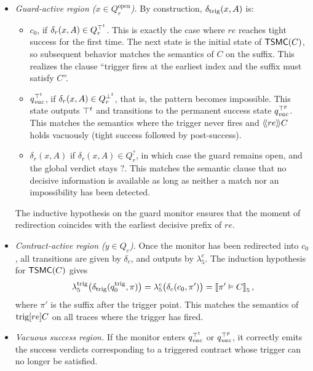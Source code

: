     \begin{itemize}
      \item \emph{Guard-active region ($x\in Q_r^{\text{open}}$).}
      By construction, $\delta_{\trigg}(x,A)$ is:
      \begin{itemize}
        \item $c_0$, if $\delta_r(x,A)\in Q_r^{\topt}$.
        This is exactly the case
        where $re$ reaches tight success for the first time.
        The next state is the
        initial state of $\tsmc(C)$, so subsequent behavior matches the semantics
        of $C$ on the suffix.
        This realizes the clause “trigger fires at the
        earliest index and the suffix must satisfy $C$”.
        
        \item $q_{\mathit{vac}}^{\topt}$, if $\delta_r(x,A)\in Q_r^{\bott}$, that is, the pattern becomes impossible.
        This state outputs $\topt$ and transitions to the permanent success state $q_{\mathit{vac}}^{\topp}$.
        This matches the semantics where the trigger never fires and $\trig[re]{C}$
        holds vacuously (tight success followed by post-success).
    
        \item $\delta_r(x,A)$ if $\delta_r(x,A)\in Q_r^{?}$, in which case the
        guard remains open, and the global verdict stays $\mathsf{?}$.
        This matches the semantic clause that no decisive information is available as long as neither a match nor an impossibility has been detected.
      \end{itemize}
      The inductive hypothesis on the guard monitor ensures that the moment of redirection coincides with the earliest decisive prefix of $re$.
    
      \item \emph{Contract-active region ($y\in Q_c$).}
      Once the monitor has been redirected into $c_0$, all transitions are given by $\delta_c$, and outputs by $\lambda_5^c$.
      The induction hypothesis for
      $\tsmc(C)$ gives
      \[
      \lambda_5^{\trigg}\bigl(\delta_{\trigg}(q_0^{\trigg},\pi)\bigr)
       = \lambda_5^{c}\bigl(\delta_c(c_0,\pi')\bigr)
       = \semfive{\pi' \vDash C},
      \]
      where $\pi'$ is the suffix after the trigger point.
      This matches the
      semantics of $\trigg[re]{C}$ on all traces where the trigger has fired.
      
      \item \emph{Vacuous success region.}
      If the monitor enters $q_{\mathit{vac}}^{\topt}$ or $q_{\mathit{vac}}^{\topp}$, it correctly emits the success verdicts corresponding to a triggered contract whose trigger can no longer be satisfied.
    \end{itemize}
    
